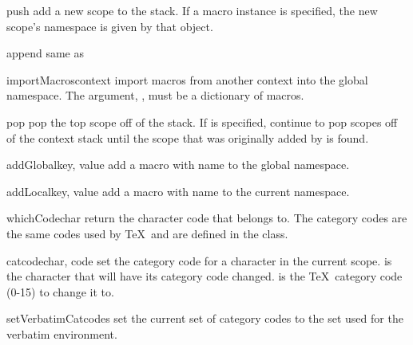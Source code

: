 \documentclass{manual}
\begin{document}
\begin{methoddesc}[Context]{push}{}
add a new scope to the stack.  If a macro instance  is specified, 
the new scope's namespace is given by that object.
\end{methoddesc}

\begin{methoddesc}[Context]{append}{}
same as 
\end{methoddesc}

\begin{methoddesc}[Context]{importMacros}{context}
import macros from another context into the global namespace.  The argument,
, must be a dictionary of macros.
\end{methoddesc}

\begin{methoddesc}[Context]{pop}{}
pop the top scope off of the stack.  If  is specified, continue
to pop scopes off of the context stack until the scope that was originally
added by  is found.  
\end{methoddesc}

\begin{methoddesc}[Context]{addGlobal}{key, value}
add a macro  with name  to the global namespace. 
\end{methoddesc}

\begin{methoddesc}[Context]{addLocal}{key, value}
add a macro  with name  to the current namespace. 
\end{methoddesc}

\begin{methoddesc}[Context]{whichCode}{char}
return the character code that  belongs to.  The category
codes are the same codes used by \TeX\ and are defined in the 
 class.  
\end{methoddesc}

\begin{methoddesc}[Context]{catcode}{char, code}
set the category code for a character in the current scope.  
is the character that will have its category code changed.  
is the \TeX\ category code (0-15) to change it to.
\end{methoddesc}

\begin{methoddesc}[Context]{setVerbatimCatcodes}{}
set the current set of category codes to the set used for the verbatim
environment.
\end{methoddesc}
\end{document}
